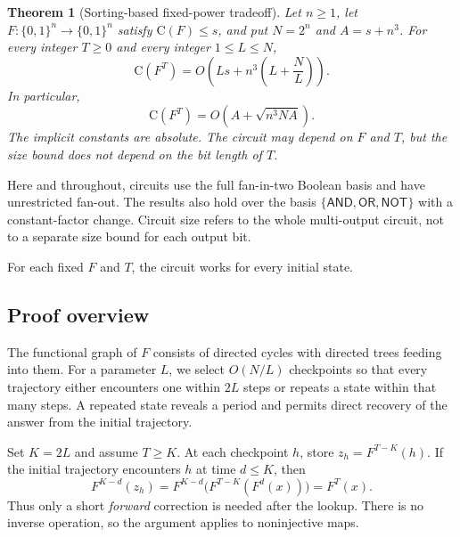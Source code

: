 \documentclass[11pt]{article}
\newtheorem{theorem}{Theorem}[section]
\newtheorem{corollary}[theorem]{Corollary}
\theoremstyle{definition}
\theoremstyle{remark}
\newcommand{\bits}{\{0,1\}}
\newcommand{\CC}{\mathrm{C}}
\numberwithin{equation}{section}
\begin{document}
\begin{theorem}[Sorting-based fixed-power tradeoff]\label{thm:main}
Let $n\geq 1$, let $F:\bits^n\to\bits^n$ satisfy $\CC(F)\leq s$, and put
$N=2^n$ and $A=s+n^3$.  For every integer $T\geq 0$ and every integer
$1\leq L\leq N$,
\begin{equation}\label{eq:tradeoff}
  \CC(F^T)
  =O\!\left(Ls+n^3\left(L+\frac{N}{L}\right)\right).
\end{equation}
In particular,
\begin{equation}\label{eq:optimized}
  \CC(F^T)
  =O\!\left(A+\sqrt{n^3NA}\right).
\end{equation}
The implicit constants are absolute.  The circuit may depend on $F$ and
$T$, but the size bound does not depend on the bit length of $T$.
\end{theorem}

Here and throughout, circuits use the full fan-in-two Boolean basis and
have unrestricted fan-out.  The results also hold over the basis
$\{\mathsf{AND},\mathsf{OR},\mathsf{NOT}\}$ with a constant-factor change.
Circuit size refers to the whole multi-output circuit, not to a separate
size bound for each output bit.


For each fixed $F$ and $T$, the circuit works for every initial state.

\subsection{Proof overview}

The functional graph of $F$ consists of directed cycles with directed
trees feeding into them.  For a parameter $L$, we select $O(N/L)$
checkpoints so that every trajectory either encounters one within $2L$
steps or repeats a state within that many steps.  A repeated state reveals
a period and permits direct recovery of the answer from the initial
trajectory.

Set $K=2L$ and assume $T\geq K$.  At each checkpoint $h$, store
$z_h=F^{T-K}(h)$.  If the initial trajectory encounters $h$ at time $d\leq K$,
then
\begin{equation}\label{eq:overview-identity}
  F^{K-d}(z_h)
  =F^{K-d}\bigl(F^{T-K}(F^d(x))\bigr)
  =F^T(x).
\end{equation}
Thus only a short \emph{forward} correction is needed after the lookup.
There is no inverse operation, so the argument applies to noninjective
maps.
\end{document}
